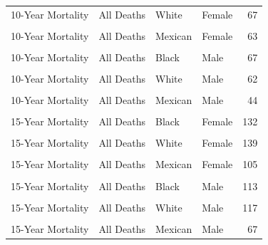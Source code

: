\documentclass[
]{article}
\begin{document}
\begin{table}[!h]
\begin{tabular}[t]{llllr}
10-Year Mortality & All Deaths & White & Female & 67\\
\cellcolor{gray!6}{10-Year Mortality} & \cellcolor{gray!6}{CVD} & \cellcolor{gray!6}{Mexican} & \cellcolor{gray!6}{Female} & \cellcolor{gray!6}{19}\\
10-Year Mortality & All Deaths & Mexican & Female & 63\\
\cellcolor{gray!6}{10-Year Mortality} & \cellcolor{gray!6}{CVD} & \cellcolor{gray!6}{Black} & \cellcolor{gray!6}{Male} & \cellcolor{gray!6}{17}\\
10-Year Mortality & All Deaths & Black & Male & 67\\
\cellcolor{gray!6}{10-Year Mortality} & \cellcolor{gray!6}{CVD} & \cellcolor{gray!6}{White} & \cellcolor{gray!6}{Male} & \cellcolor{gray!6}{13}\\
10-Year Mortality & All Deaths & White & Male & 62\\
\cellcolor{gray!6}{10-Year Mortality} & \cellcolor{gray!6}{CVD} & \cellcolor{gray!6}{Mexican} & \cellcolor{gray!6}{Male} & \cellcolor{gray!6}{10}\\
10-Year Mortality & All Deaths & Mexican & Male & 44\\
\addlinespace
\cellcolor{gray!6}{15-Year Mortality} & \cellcolor{gray!6}{CVD} & \cellcolor{gray!6}{Black} & \cellcolor{gray!6}{Female} & \cellcolor{gray!6}{37}\\
15-Year Mortality & All Deaths & Black & Female & 132\\
\cellcolor{gray!6}{15-Year Mortality} & \cellcolor{gray!6}{CVD} & \cellcolor{gray!6}{White} & \cellcolor{gray!6}{Female} & \cellcolor{gray!6}{44}\\
15-Year Mortality & All Deaths & White & Female & 139\\
\cellcolor{gray!6}{15-Year Mortality} & \cellcolor{gray!6}{CVD} & \cellcolor{gray!6}{Mexican} & \cellcolor{gray!6}{Female} & \cellcolor{gray!6}{35}\\
15-Year Mortality & All Deaths & Mexican & Female & 105\\
\cellcolor{gray!6}{15-Year Mortality} & \cellcolor{gray!6}{CVD} & \cellcolor{gray!6}{Black} & \cellcolor{gray!6}{Male} & \cellcolor{gray!6}{26}\\
15-Year Mortality & All Deaths & Black & Male & 113\\
\cellcolor{gray!6}{15-Year Mortality} & \cellcolor{gray!6}{CVD} & \cellcolor{gray!6}{White} & \cellcolor{gray!6}{Male} & \cellcolor{gray!6}{29}\\
15-Year Mortality & All Deaths & White & Male & 117\\
\cellcolor{gray!6}{15-Year Mortality} & \cellcolor{gray!6}{CVD} & \cellcolor{gray!6}{Mexican} & \cellcolor{gray!6}{Male} & \cellcolor{gray!6}{18}\\
15-Year Mortality & All Deaths & Mexican & Male & 67\\
\bottomrule
\end{tabular}
\end{table}
\end{document}
